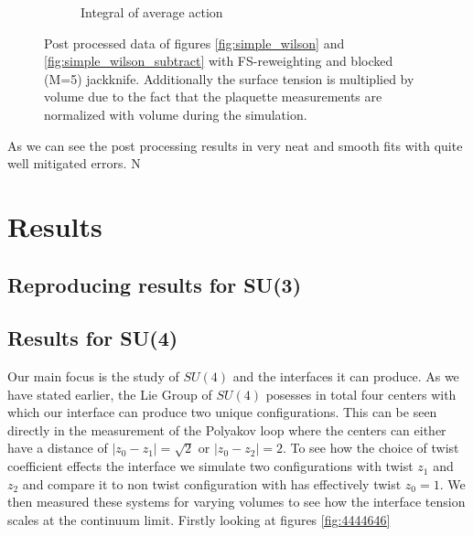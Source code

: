 \documentclass[english,twoside,openright]{UH_TCM_MSc}
\begin{document}
\begin{figure}[htpb]
\begin{subfigure}[t]{\textwidth}
        \caption{Integral of average action}
        \label{fig:fs-reweight-integral}
    \end{subfigure}
    \caption{Post processed data of figures \ref{fig:simple_wilson} and \ref{fig:simple_wilson_subtract} with FS-reweighting and blocked (M=5) jackknife. Additionally the surface tension is multiplied by volume due to the fact that the plaquette measurements are normalized with volume during the simulation.}
    \label{fig:FS-example}
\end{figure}
As we can see the post processing results in very neat and smooth fits with quite well mitigated errors. N 

\chapter{Results}

\section{Reproducing results for SU(3)}

\section{Results for SU(4)}

Our main focus is the study of $SU(4)$ and the interfaces it can produce. As we have stated earlier, the Lie Group of $SU(4)$ posesses in total four centers with which our interface can produce two unique configurations. This can be seen directly in the measurement of the Polyakov loop where the centers can either have a distance of $|z_0 - z_1| = \sqrt{2}$ or $|z_0 - z_2| = 2$. To see how the choice of twist coefficient effects the interface we simulate two configurations with twist $z_1$ and $z_2$ and compare it to non twist configuration with has effectively twist $z_0 = 1$. We then measured these systems for varying volumes to see how the interface tension scales at the continuum limit. Firstly looking at figures \ref{fig:4444646}
\end{document}
